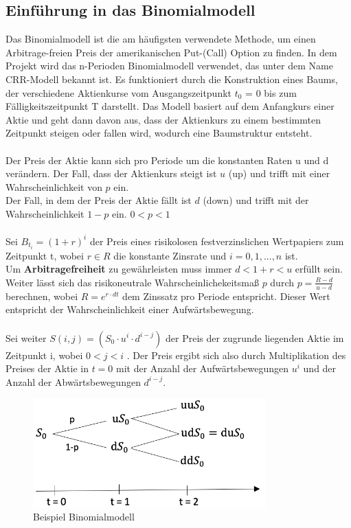 \documentclass[12pt,a4paper]{article}
\begin{document}
\begin{text}
\section{Einführung in das Binomialmodell}
Das Binomialmodell ist die am häufigsten verwendete Methode, um einen Arbitrage-freien Preis der amerikanischen Put-(Call) Option zu finden. In dem Projekt wird das n-Perioden Binomialmodell verwendet, das unter dem Name CRR-Modell bekannt ist. Es funktioniert durch die Konstruktion eines Baums, der verschiedene Aktienkurse vom Ausgangszeitpunkt $t_0$ = 0 bis zum Fälligkeitszeitpunkt T darstellt. Das Modell basiert auf dem Anfangkurs einer Aktie und geht dann davon aus, dass der Aktienkurs zu einem bestimmten Zeitpunkt steigen oder fallen wird, wodurch eine Baumstruktur entsteht.
\\\\ Der Preis der Aktie kann sich pro Periode um die konstanten Raten u und d verändern. Der Fall, dass der Aktienkurs steigt ist $u$ (up) und trifft mit einer Wahrscheinlichkeit von $p$ ein.
\\
Der Fall, in dem der Preis der Aktie fällt ist $d$ (down) und trifft mit der \\Wahrscheinlichkeit $1-p$ ein. $0 < p < 1$
\\\\
Sei $B_{t_i} = (1+r)^i$ der Preis eines risikolosen festverzinslichen Wertpapiers zum Zeitpunkt t, wobei $r \in R $ die konstante Zinsrate und $i = 0,1,...,n$ ist.
\\
Um \textbf{Arbitragefreiheit} zu gewährleisten muss immer $d < 1+r < u$ erfüllt sein. Weiter lässt sich das risikoneutrale Wahrscheinlichekeitsmaß $p$ durch $p = \frac{R-d}{u-d}$ berechnen, wobei $R = e^{r\cdot dt}$ dem Zinssatz pro Periode entspricht. Dieser Wert entspricht der Wahrscheinlichkeit einer Aufwärtsbewegung.
\\\\
Sei weiter $S(i,j) = (S_0 \cdot u^{i} \cdot d^{i-j})$ der Preis der zugrunde liegenden Aktie im Zeitpunkt i, wobei $0<j<i$ . Der Preis ergibt sich also durch Multiplikation des Preises der Aktie in $t=0$ mit der Anzahl der Aufwärtsbewegungen $u^{i}$ und der Anzahl der Abwärtsbewegungen $d^{i-j}$.

\begin{figure}[h]
\begin{center}
 \includegraphics[width=0.8\textwidth]{BinomialModell.png}
 \caption{Beispiel Binomialmodell}
\end{center}
\end{figure}


\end{text}
\end{document}
